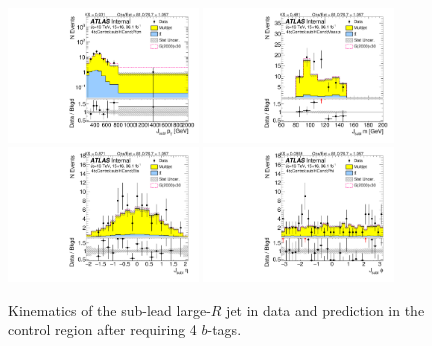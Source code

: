 \begin{figure}[htbp!]
\begin{center}
\includegraphics[angle=270, width=0.45\textwidth]{./figures/boosted/Control/b77_FourTag_Control_sublHCand_Pt_m_1.pdf}
\includegraphics[angle=270, width=0.45\textwidth]{./figures/boosted/Control/b77_FourTag_Control_sublHCand_Mass_s.pdf}\\
\includegraphics[angle=270, width=0.45\textwidth]{./figures/boosted/Control/b77_FourTag_Control_sublHCand_Eta.pdf}
\includegraphics[angle=270, width=0.45\textwidth]{./figures/boosted/Control/b77_FourTag_Control_sublHCand_Phi.pdf}
  \caption{Kinematics of the sub-lead large-$R$ jet in data and prediction in the control region after requiring 4 $b$-tags. }
  \label{fig:boosted-4b-control-ak10-subl}
\end{center}
\end{figure}

